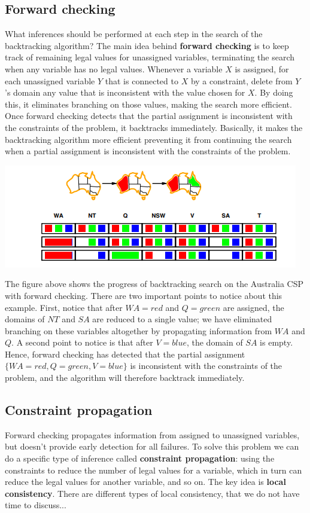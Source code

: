 \subsection{Forward checking}
What inferences should be performed at each step in the search of the backtracking algorithm? The main idea behind \textbf{forward checking} is to keep track of remaining legal values for unassigned variables, terminating the search when any variable has no legal values. Whenever a variable $X$ is assigned, for each unassigned variable $Y$ that is connected to $X$ by a constraint, delete from $Y$ ’s domain any value that is inconsistent with the value chosen for $X$. By doing this, it eliminates branching on those values, making the search more efficient. Once forward checking detects that the partial assignment is inconsistent with the constraints of the problem, it backtracks immediately. Basically, it makes the backtracking algorithm more efficient preventing it from continuing the search when a partial assignment is inconsistent with the constraints of the problem.
\begin{center}
    \includegraphics[]{images/CSP-forward-checking.png}
\end{center}
The figure above shows the progress of backtracking search on the Australia CSP with forward checking. There are two important points to notice about this example. First, notice that after $WA = red$ and $Q = green$ are assigned, the domains of $NT$ and $SA$ are reduced to a single value; we have eliminated branching on these variables altogether by propagating information from $WA$ and $Q$. A second point to notice is that after $V = blue$, the domain of $SA$ is empty. Hence, forward checking has detected that the partial assignment
$\{WA = red, Q = green, V = blue\}$ is inconsistent with the constraints of the problem, and the algorithm will therefore backtrack immediately.

\subsection{Constraint propagation}
Forward checking propagates information from assigned to unassigned variables, but doesn’t provide early detection for all failures. To solve this problem we can do a specific type of inference called \textbf{constraint propagation}:  using the constraints to reduce the number of legal values for a variable, which in turn can reduce the legal values for another variable, and so on. The key idea is \textbf{local consistency}. There are different types of local consistency, that we do not have time to discuss...

